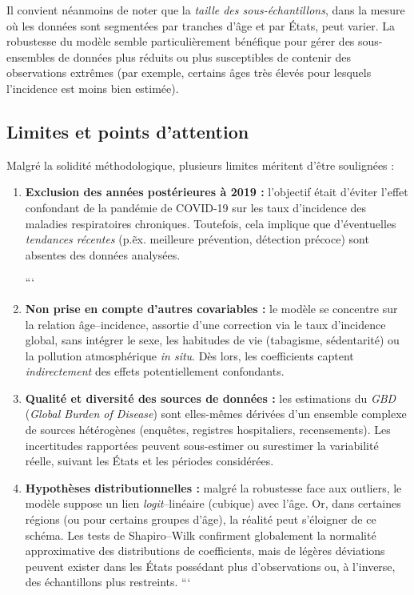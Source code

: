 Il convient néanmoins de noter que la \emph{taille des sous-échantillons}, dans la mesure où les données sont segmentées par tranches d’âge et par États, peut varier. La robustesse du modèle semble particulièrement bénéfique pour gérer des sous-ensembles de données plus réduits ou plus susceptibles de contenir des observations extrêmes (par exemple, certains âges très élevés pour lesquels l’incidence est moins bien estimée).

\subsection{Limites et points d'attention}

Malgré la solidité méthodologique, plusieurs limites méritent d’être soulignées :
\begin{enumerate}
	\item \textbf{Exclusion des années postérieures à 2019 :} l’objectif était d’éviter l’effet confondant de la pandémie de COVID-19 sur les taux d’incidence des maladies respiratoires chroniques. Toutefois, cela implique que d’éventuelles \emph{tendances récentes} (p.\~ex. meilleure prévention, détection précoce) sont absentes des données analysées.
	
	```
	\item \textbf{Non prise en compte d’autres covariables :} le modèle se concentre sur la relation âge–incidence, assortie d’une correction via le taux d’incidence global, sans intégrer le sexe, les habitudes de vie (tabagisme, sédentarité) ou la pollution atmosphérique \emph{in situ}. Dès lors, les coefficients captent \emph{indirectement} des effets potentiellement confondants.
	
	\item \textbf{Qualité et diversité des sources de données :} les estimations du \emph{GBD} (\emph{Global Burden of Disease}) sont elles-mêmes dérivées d’un ensemble complexe de sources hétérogènes (enquêtes, registres hospitaliers, recensements). Les incertitudes rapportées peuvent sous-estimer ou surestimer la variabilité réelle, suivant les États et les périodes considérées.
	
	\item \textbf{Hypothèses distributionnelles :} malgré la robustesse face aux outliers, le modèle suppose un lien \emph{logit}--linéaire (cubique) avec l’âge. Or, dans certaines régions (ou pour certains groupes d’âge), la réalité peut s’éloigner de ce schéma. Les tests de Shapiro--Wilk confirment globalement la normalité approximative des distributions de coefficients, mais de légères déviations peuvent exister dans les États possédant plus d’observations ou, à l’inverse, des échantillons plus restreints.
	```
	
\end{enumerate}

